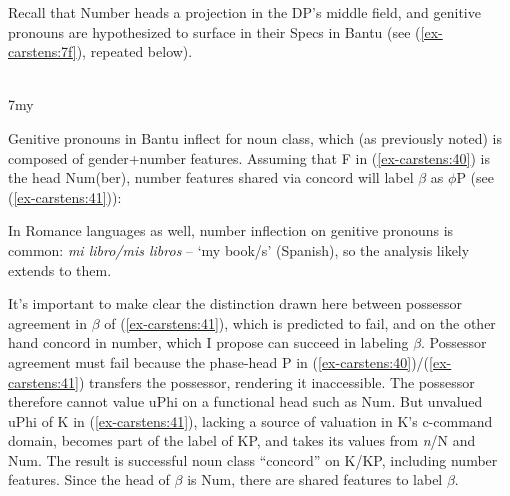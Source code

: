 \documentclass[output=paper
,modfonts
,nonflat]{langsci/langscibook}
\begin{document}
\noindent Recall that Number heads a projection in the DP’s middle field, and genitive pronouns are hypothesized to surface in their Specs in Bantu (see (\ref{ex-carstens:7f}), repeated below).

\begin{exe}
	\gll {}\\
	\mbox{\hspace{3.5cm}7my}  \\
\end{exe}
Genitive pronouns in Bantu inflect for noun class, which (as previously noted) is composed of gender+number features. Assuming that F in (\ref{ex-carstens:40}) is the head Num(ber), number features shared via concord will label $\beta$ as $\phi$P (see (\ref{ex-carstens:41})):

\begin{figure}[!h]
	\begin{exe}
	\end{exe} \vspace{-0.4cm}
\end{figure}
\noindent In Romance languages as well, number inflection on genitive pronouns is common: \textit{mi libro/mis libros} – ‘my book/s’ (Spanish), so the analysis likely extends to them.

It’s important to make clear the distinction drawn here between possessor agreement in $\beta$ of (\ref{ex-carstens:41}), which is predicted to fail, and on the other hand concord in number, which I propose can succeed in labeling $\beta$. Possessor agreement must fail because the phase-head P in (\ref{ex-carstens:40})/(\ref{ex-carstens:41}) transfers the possessor, rendering it inaccessible. The possessor therefore cannot value uPhi on a functional head such as Num. But unvalued uPhi of K in (\ref{ex-carstens:41}), lacking a source of valuation in K’s c-command domain, becomes part of the label of KP, and takes its values from \textit{n}/N and Num. The result is successful noun class “concord” on K/KP, including number features. Since the head of $\beta$ is Num, there are shared features to label $\beta$.  
\end{document}
